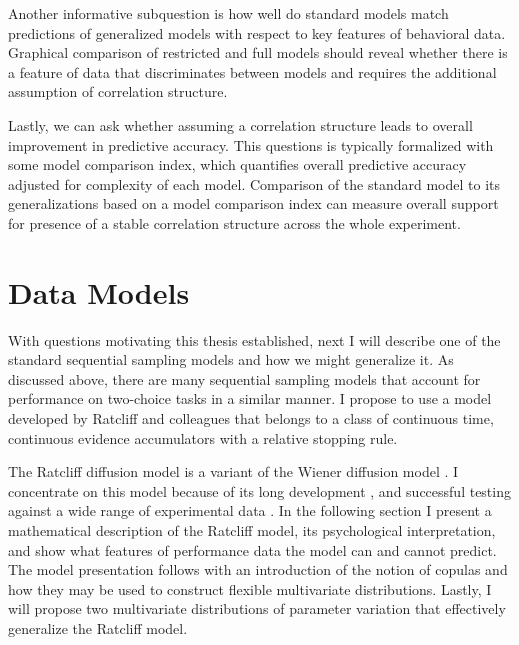 \documentclass[12pt]{report}
\begin{document}
Another informative subquestion is how well do standard models match predictions of generalized models with respect to key features of behavioral data. Graphical comparison of restricted and full models should reveal whether there is a feature of data that discriminates between models and requires the additional assumption of correlation structure. 

Lastly, we can ask whether assuming a correlation structure leads to overall improvement in predictive accuracy. This questions is typically formalized with some model comparison index, which quantifies overall predictive accuracy adjusted for complexity of each model. Comparison of the standard model to its generalizations based on a model comparison index can measure overall support for presence of a stable correlation structure across the whole experiment.

\chapter{Data Models}

With questions motivating this thesis established, next I will describe one of the standard sequential sampling models and how we might generalize it. As discussed above, there are many sequential sampling models that account for performance on two-choice tasks in a similar manner. I propose to use a model developed by Ratcliff and colleagues that belongs to a class of continuous time, continuous evidence accumulators with a relative stopping rule.

The Ratcliff diffusion model is a variant of the Wiener diffusion model
\citep{Lam1968,LinHea1975,Rat1978,RatRou1998,RatTue2002}. I
concentrate on this model because of its long development \citep{Rat1978,RatRou1998,Rat2002,RatTue2002,Rat2013}, and successful
testing against a wide range of experimental data \citep{RatMck2008,Wag2009}. In the following section I present a mathematical description of the Ratcliff model, its psychological interpretation, and show what features of performance data the model can and cannot predict. The model presentation follows with an introduction of the notion of copulas and how they may be used to construct flexible multivariate distributions. Lastly, I will propose two multivariate distributions of parameter variation that effectively generalize the Ratcliff model.

\end{document}
